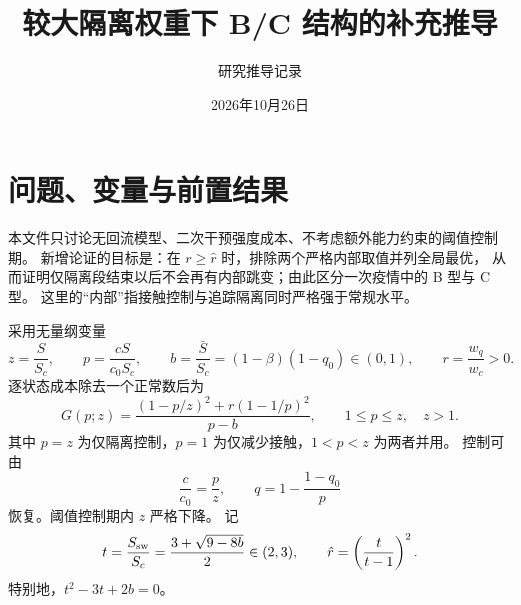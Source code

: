 \documentclass[UTF8,zihao=-4]{ctexart}
\title{较大隔离权重下 B/C 结构的补充推导}
\author{研究推导记录}
\date{2026年10月26日}
\theoremstyle{definition}
\newcommand{\rhat}{\hat r}
\begin{document}
\maketitle

\section{问题、变量与前置结果}

本文件只讨论无回流模型、二次干预强度成本、不考虑额外能力约束的阈值控制期。
新增论证的目标是：在 $r\ge\rhat$ 时，排除两个严格内部取值并列全局最优，
从而证明仅隔离段结束以后不会再有内部跳变；由此区分一次疫情中的 B 型与 C 型。
这里的“内部”指接触控制与追踪隔离同时严格强于常规水平。

采用无量纲变量
\begin{equation}
 z=\frac{S}{S_c},\qquad p=\frac{cS}{c_0S_c},\qquad
 b=\frac{\bar S}{S_c}=(1-\beta)(1-q_0)\in(0,1),\qquad
 r=\frac{w_q}{w_c}>0.
\end{equation}
逐状态成本除去一个正常数后为
\begin{equation}\label{eq:G}
 G(p;z)=\frac{(1-p/z)^2+r(1-1/p)^2}{p-b},
 \qquad 1\le p\le z,\quad z>1.
\end{equation}
其中 $p=z$ 为仅隔离控制，$p=1$ 为仅减少接触，$1<p<z$ 为两者并用。
控制可由
\[
 \frac{c}{c_0}=\frac pz,\qquad q=1-\frac{1-q_0}{p}
\]
恢复。阈值控制期内 $z$ 严格下降。
记
\begin{equation}\label{eq:t}
 t=\frac{S_{\rm sw}}{S_c}=\frac{3+\sqrt{9-8b}}2\in(2,3),
 \qquad \rhat=\left(\frac{t}{t-1}\right)^2.
\end{equation}
特别地，$t^2-3t+2b=0$。
\end{document}
